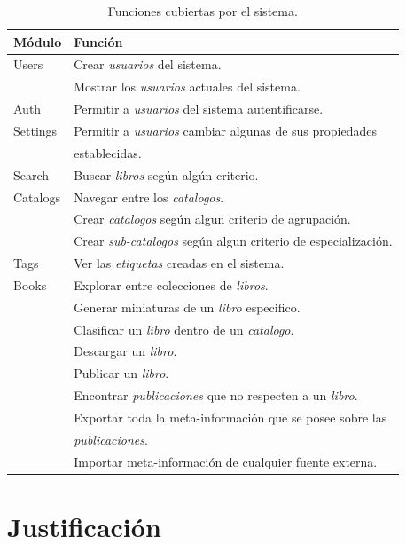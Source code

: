\documentclass[letter,12pt]{article}
\begin{document}
\begin{table}
\begin{tabular}{l|l}
Módulo & Función \\
\hline
Users    & Crear \emph{usuarios} del sistema.                           \\
	     & Mostrar los \emph{usuarios} actuales del sistema. 			\\
Auth     & Permitir a \emph{usuarios} del sistema autentificarse.       \\
Settings & Permitir a \emph{usuarios} cambiar algunas de sus propiedades \\
	     & establecidas. \\ 
Search   & Buscar \emph{libros} según algún criterio. 					\\
Catalogs & Navegar entre los \emph{catalogos}.		 					\\
	     & Crear \emph{catalogos} según algun criterio de agrupación.   \\
	     & Crear \emph{sub-catalogos} según algun criterio de especialización. \\
Tags     & Ver las \emph{etiquetas} creadas en el sistema. 				\\
Books    & Explorar entre colecciones de \emph{libros}. 				\\
	     & Generar miniaturas de un \emph{libro} especifico.			\\
	     & Clasificar un \emph{libro} dentro de un \emph{catalogo}.     \\
	     & Descargar un \emph{libro}.									\\
	     & Publicar un \emph{libro}.                                    \\
	     & Encontrar \emph{publicaciones} que no respecten a un \emph{libro}. \\
	     & Exportar toda la meta-información que se posee sobre las     \\
	     & \emph{publicaciones}. \\
	     & Importar meta-información de cualquier fuente externa.       \\
\end{tabular}
\caption{Funciones cubiertas por el sistema.}
\label{funciones_actuales}
\end{table}

\section{Justificación}
\end{document}
